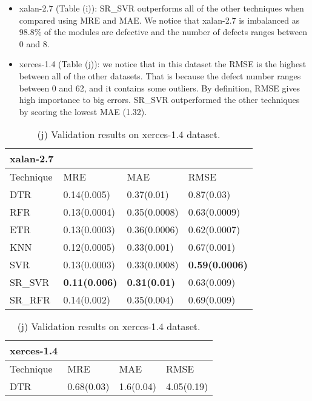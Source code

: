 \documentclass[]{article}
\begin{document}
	\FloatBarrier
	\begin{itemize}
		\item xalan-2.7 (Table (i)): SR\_SVR outperforms all of the other techniques when compared using MRE and MAE. We notice that xalan-2.7 is imbalanced as 98.8\% of the modules are defective and the number of defects ranges between 0 and 8.
		\item xerces-1.4 (Table (j)): we notice that in this dataset the RMSE is the highest between all of the other datasets. That is because the defect number ranges between 0 and 62, and it contains some outliers. By definition, RMSE gives high importance to big errors. SR\_SVR outperformed the other techniques by scoring the lowest MAE (1.32).
	\end{itemize}
	\FloatBarrier
	\begin{table}[h]
		\captionsetup[subtable]{labelformat=empty}
		\begin{adjustwidth}{-3.4cm}{}
			\begin{subtable}{9.5cm}
				\centering
				\caption{(i) Validation results on xalan-2.7 dataset.}
				\label{tab:xalan-wv}
				\begin{tabular}{llll}
					\hline
					xalan-2.7 &&&\\ \hline
					Technique & MRE & MAE & RMSE\\  \hline
					DTR & 0.14(0.005) & 0.37(0.01) & 0.87(0.03)\\ 
					RFR & 0.13(0.0004) & 0.35(0.0008) & 0.63(0.0009)\\ 
					ETR & 0.13(0.0003) & 0.36(0.0006) & 0.62(0.0007)\\ 
					KNN & 0.12(0.0005) & 0.33(0.001) & 0.67(0.001)\\ 
					SVR & 0.13(0.0003) & 0.33(0.0008) & \bfseries 0.59(0.0006)\\ 
					SR\_SVR & \bfseries 0.11(0.006) & \bfseries 0.31(0.01) & 0.63(0.009)\\
					SR\_RFR & 0.14(0.002) & 0.35(0.004) & 0.69(0.009)\\ \hline
				\end{tabular}
			\end{subtable}
			\begin{subtable}{9cm}
				\centering
				\caption{(j) Validation results on xerces-1.4 dataset.}
				\label{tab:xerces-wv}
				\begin{tabular}{llll}
					\hline
					xerces-1.4 &&&\\ \hline
					Technique & MRE & MAE & RMSE\\  \hline
					DTR & 0.68(0.03) & 1.6(0.04) & 4.05(0.19)\\ 

\end{tabular}
\end{subtable}
\end{adjustwidth}
\end{table}
\end{document}
